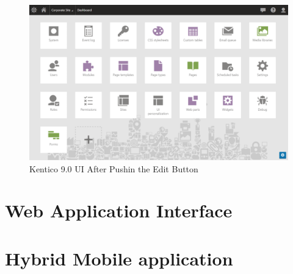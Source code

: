 \begin{figure}[ht!]
  \centering
  \includegraphics[width=\textwidth]{Images/Kentico9EditBtnPushed.png}
  \caption{Kentico 9.0 UI After Pushin the Edit Button}
  \label{kentico9.0UI}
\end{figure} 
\section{Web Application Interface} \label{analysisWebAPI}
\section{Hybrid Mobile application} \label{analysisHybridMobileApplication}
